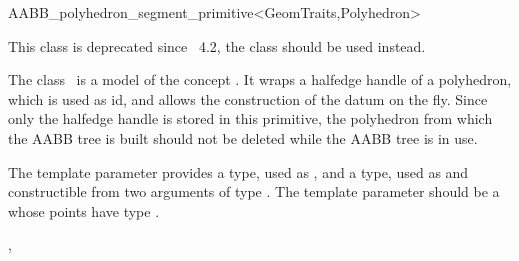 \ccRefPageBegin


\begin{ccRefClass}{AABB_polyhedron_segment_primitive<GeomTraits,Polyhedron>}


This class is deprecated since \cgal\ 4.2, the class  should be used instead.

\begin{ccDeprecated}

\ccDefinition
  
The class \ccRefName\ is a model of the concept . It wraps a halfedge handle of a polyhedron, which is used as id, and allows the construction of the datum on the fly. Since only the halfedge handle is stored in this primitive, the polyhedron from which the AABB tree is built should not be deleted while the AABB tree is in use.

\ccParameters
The template parameter  provides a  type, used as , and a  type, used as  and constructible from two arguments of type . The template parameter  should be a  whose points have type .


\ccTypes
{}
\ccGlue
{}

\ccSeeAlso

,\\
\\
\end{ccDeprecated}

\end{ccRefClass}


\ccRefPageEnd

